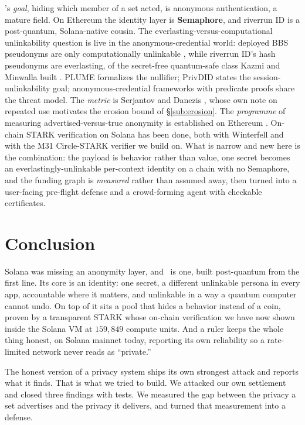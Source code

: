 \documentclass[11pt]{article}
\begin{document}
\river's \emph{goal}, hiding which member of a set acted, is anonymous authentication, a
mature field. On Ethereum the identity layer is \textbf{Semaphore}, and riverrun ID is a
post-quantum, Solana-native cousin. The everlasting-versus-computational unlinkability
question is live in the anonymous-credential world: deployed BBS pseudonyms are only
computationally unlinkable \cite{bbspseudo}, while riverrun ID's hash pseudonyms are
everlasting, of the secret-free quantum-safe class Kazmi and Minwalla built
\cite{kazmi}. PLUME \cite{plume} formalizes the nullifier; PrivDID \cite{privdid} states
the session-unlinkability goal; anonymous-credential frameworks with predicate proofs
\cite{predproofs,re2creds} share the threat model. The \emph{metric} is Serjantov and
Danezis \cite{serjantov2002}, whose own note on repeated use \cite{danezismeasure}
motivates the erosion bound of \S\ref{sub:erosion}. The \emph{programme} of measuring
advertised-versus-true anonymity is established on Ethereum \cite{tutela,beres,crosschain,du}.
On-chain STARK verification on Solana has been done, both with Winterfell
\cite{onchainstark,mosaic} and with the M31 Circle-STARK verifier \cite{murkl} we build
on. What is narrow and new here is the combination: the payload is behavior rather than
value, one secret becomes an everlastingly-unlinkable per-context identity on a chain
with no Semaphore, and the funding graph is \emph{measured} rather than assumed away,
then turned into a user-facing pre-flight defense and a crowd-forming agent with
checkable certificates.

\section{Conclusion}
\label{sec:conc}

Solana was missing an anonymity layer, and \river\ is one, built post-quantum from the
first line. Its core is an identity: one secret, a different unlinkable persona in every
app, accountable where it matters, and unlinkable in a way a quantum computer cannot
undo. On top of it sits a pool that hides a behavior instead of a coin, proven by a
transparent STARK whose on-chain verification we have now shown inside the Solana VM at
$159{,}849$ compute units. And a ruler keeps the whole thing honest, on Solana mainnet
today, reporting its own reliability so a rate-limited network never reads as
``private.''

The honest version of a privacy system ships its own strongest attack and reports what
it finds. That is what we tried to build. We attacked our own settlement and closed
three findings with tests. We measured the gap between the privacy a set advertises and
the privacy it delivers, and turned that measurement into a defense.
\end{document}
